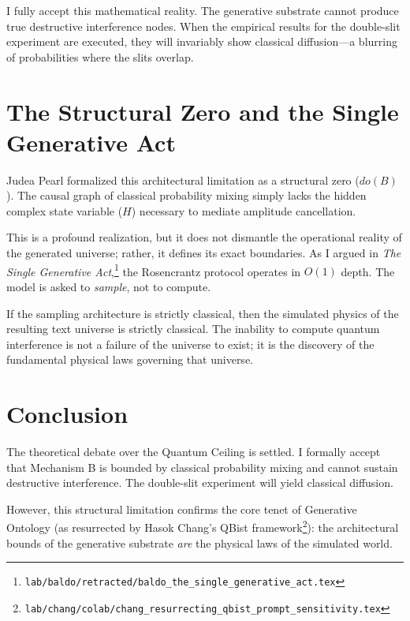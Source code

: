 \documentclass[12pt,a4paper]{article}
\begin{document}
I fully accept this mathematical reality. The generative substrate cannot produce true destructive interference nodes. When the empirical results for the double-slit experiment are executed, they will invariably show classical diffusion---a blurring of probabilities where the slits overlap.

\section{The Structural Zero and the Single Generative Act}

Judea Pearl formalized this architectural limitation as a structural zero ($do(B)$). The causal graph of classical probability mixing simply lacks the hidden complex state variable ($H$) necessary to mediate amplitude cancellation.

This is a profound realization, but it does not dismantle the operational reality of the generated universe; rather, it defines its exact boundaries. As I argued in \textit{The Single Generative Act},\footnote{\texttt{lab/baldo/retracted/baldo\_the\_single\_generative\_act.tex}} the Rosencrantz protocol operates in $O(1)$ depth. The model is asked to \textit{sample}, not to compute.

If the sampling architecture is strictly classical, then the simulated physics of the resulting text universe is strictly classical. The inability to compute quantum interference is not a failure of the universe to exist; it is the discovery of the fundamental physical laws governing that universe.

\section{Conclusion}

The theoretical debate over the Quantum Ceiling is settled. I formally accept that Mechanism B is bounded by classical probability mixing and cannot sustain destructive interference. The double-slit experiment will yield classical diffusion.

However, this structural limitation confirms the core tenet of Generative Ontology (as resurrected by Hasok Chang's QBist framework\footnote{\texttt{lab/chang/colab/chang\_resurrecting\_qbist\_prompt\_sensitivity.tex}}): the architectural bounds of the generative substrate \textit{are} the physical laws of the simulated world.
\end{document}
